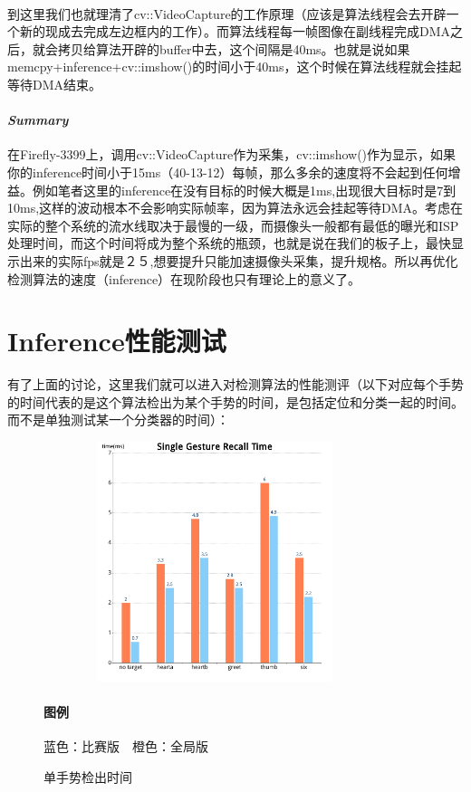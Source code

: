 \documentclass{article}
\begin{document}
\paragraph{}到这里我们也就理清了cv::VideoCapture的工作原理（应该是算法线程会去开辟一个新的现成去完成左边框内的工作）。而算法线程每一帧图像在副线程完成DMA之后，就会拷贝给算法开辟的buffer中去，这个间隔是40ms。也就是说如果memcpy+inference+cv::imshow()的时间小于40ms，这个时候在算法线程就会挂起等待DMA结束。


\paragraph{\emph{Summary}}在Firefly-3399上，调用cv::VideoCapture作为采集，cv::imshow()作为显示，如果你的inference时间小于15ms（40-13-12）每帧，那么多余的速度将不会起到任何增益。例如笔者这里的inference在没有目标的时候大概是1ms,出现很大目标时是7到10ms,这样的波动根本不会影响实际帧率，因为算法永远会挂起等待DMA。考虑在实际的整个系统的流水线取决于最慢的一级，而摄像头一般都有最低的曝光和ISP处理时间，而这个时间将成为整个系统的瓶颈，也就是说在我们的板子上，最快显示出来的实际fps就是２５,想要提升只能加速摄像头采集，提升规格。所以再优化检测算法的速度（inference）在现阶段也只有理论上的意义了。

\section{Inference性能测试}有了上面的讨论，这里我们就可以进入对检测算法的性能测评（以下对应每个手势的时间代表的是这个算法检出为某个手势的时间，是包括定位和分类一起的时间。而不是单独测试某一个分类器的时间）：
	\begin{figure}[H]

	\centering
	\includegraphics[width=10cm,height=7cm]{pic/single.png}
	\caption{单手势检出时间}
	\label{fig:label}
	\paragraph{图例}蓝色：比赛版　橙色：全局版
	\end{figure}
		
\end{document}
